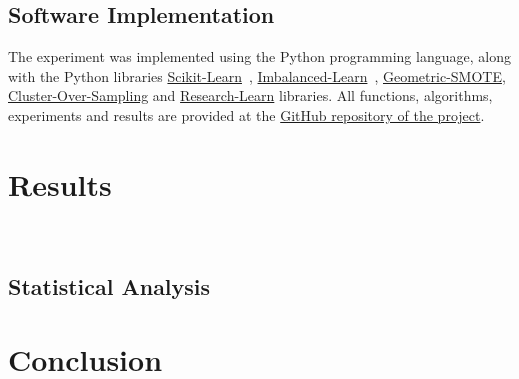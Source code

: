 \documentclass[parskip=full]{scrartcl}
\begin{document}
\subsection{Software Implementation}

The experiment was implemented using the Python programming language, along with
the Python libraries
\href{https://scikit-learn.org/stable/}{Scikit-Learn}~\cite{Pedregosa2011},
\href{https://imbalanced-learn.org/en/stable/}{Imbalanced-Learn}~\cite{JMLR:v18:16-365},
\href{https://geometric-smote.readthedocs.io/en/latest/?badge=latest}{Geometric-SMOTE},
\href{https://cluster-over-sampling.readthedocs.io/en/latest/?badge=latest}{Cluster-Over-Sampling}
and
\href{https://research-learn.readthedocs.io/en/latest/?badge=latest}{Research-Learn}
libraries.  All functions, algorithms, experiments and results are provided at
the
\href{https://github.com/AlgoWit/publications/tree/master/remote-sensing/al-generator}{GitHub
repository of the project}.

\section{Results}~\label{sec:results}



\subsection{Statistical Analysis}

\section{Conclusion}~\label{sec:conclusion}



\end{document}
